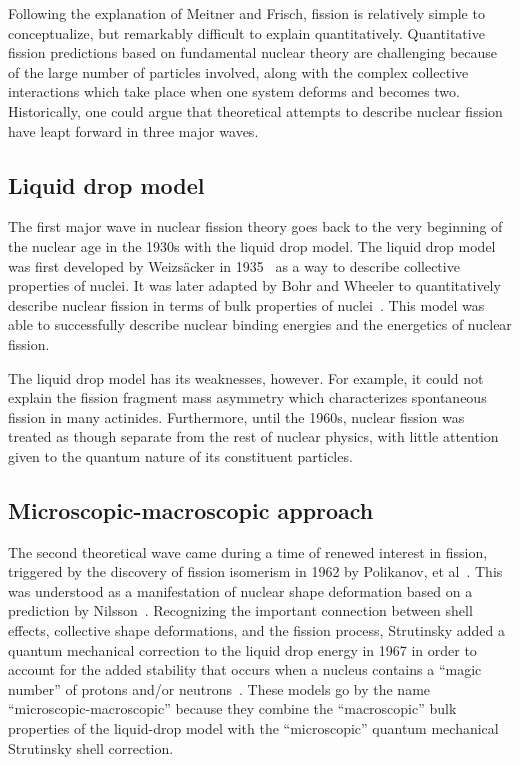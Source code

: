 Following the explanation of Meitner and Frisch, fission is relatively simple to conceptualize, but remarkably difficult to explain quantitatively. Quantitative fission predictions based on fundamental nuclear theory are challenging because of the large number of particles involved, along with the complex collective interactions which take place when one system deforms and becomes two. Historically, one could argue that theoretical attempts to describe nuclear fission have leapt forward in three major waves.

\subsection{Liquid drop model}
The first major wave in nuclear fission theory goes back to the very beginning of the nuclear age in the 1930s with the liquid drop model. The liquid drop model was first developed by Weizs\"acker in 1935~\cite{Weizsacker1935} as a way to describe collective properties of nuclei. It was later adapted by Bohr and Wheeler to quantitatively describe nuclear fission in terms of bulk properties of nuclei~\cite{Bohr1939}. This model was able to successfully describe nuclear binding energies and the energetics of nuclear fission.

The liquid drop model has its weaknesses, however. For example, it could not explain the fission fragment mass asymmetry which characterizes spontaneous fission in many actinides. Furthermore, until the 1960s, nuclear fission was treated as though separate from the rest of nuclear physics, with little attention given to the quantum nature of its constituent particles.%

\subsection{Microscopic-macroscopic approach}
The second theoretical wave came during a time of renewed interest in fission, triggered by the discovery of fission isomerism in 1962 by Polikanov, et al~\cite{Polikanov1962}. This was understood as a manifestation of nuclear shape deformation based on a prediction by Nilsson~\cite{Nilsson1955}. Recognizing the important connection between shell effects, collective shape deformations, and the fission process, Strutinsky added a quantum mechanical correction to the liquid drop energy in 1967 in order to account for the added stability that occurs when a nucleus contains a ``magic number'' of protons and/or neutrons~\cite{Strutinsky1967, Strutinsky1968, Brack1972}. These models go by the name ``microscopic-macroscopic'' because they combine the ``macroscopic'' bulk properties of the liquid-drop model with the ``microscopic'' quantum mechanical Strutinsky shell correction.

